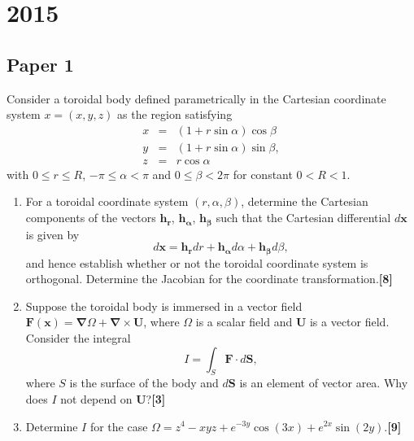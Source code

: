 \documentclass[a4paper]{article}
\begin{document}
\section{2015}
\subsection{Paper 1}
\begin{qns}
Consider a toroidal body defined parametrically in the Cartesian coordinate system $x = (x, y, z)$ as the region satisfying
\begin{eqnarray}
x &=& (1 + r\sin\alpha) \cos\beta\nonumber\\
y&=&(1 + r\sin \alpha) \sin\beta ,\nonumber\\
z&=&r\cos\alpha\nonumber
\end{eqnarray}
with $0\leq r\leq R$, $−\pi\leq\alpha<\pi$ and $0\leq\beta<2\pi$ for constant $0 < R < 1$.
\begin{enumerate}[label=(\alph*)]
    \item For a toroidal coordinate system $(r, \alpha, \beta)$, determine the Cartesian components of the vectors $\mathbf{h_r}$, $\mathbf{h_\alpha}$, $\mathbf{h_\beta}$ such that the Cartesian differential $d\mathbf{x}$ is given by
$$d\mathbf{x} = \mathbf{h_r}dr +\mathbf{h_\alpha}d\alpha + \mathbf{h_\beta}d\beta,$$
and hence establish whether or not the toroidal coordinate system is orthogonal. Determine the Jacobian for the coordinate transformation.\hfill \textbf{[8]}
\item Suppose the toroidal body is immersed in a vector field $\mathbf{F}(\mathbf{x})=\boldsymbol{\nabla}\Omega+\boldsymbol{\nabla}\times\mathbf{U}$, where $\Omega$ is a scalar field and $\mathbf{U}$ is a vector field. Consider the integral
$$I=\int_S\mathbf{F}\cdot d\mathbf{S},$$
where $S$ is the surface of the body and $d\mathbf{S}$ is an element of vector area. Why does $I$ not depend on $\mathbf{U}$?\hfill \textbf{[3]}
\item Determine $I$ for the case $\Omega=z^4-xyz+e^{-3y}\cos(3x)+e^{2x}\sin(2y)$.\hfill \textbf{[9]}
\end{enumerate}
\end{qns}
\end{document}
